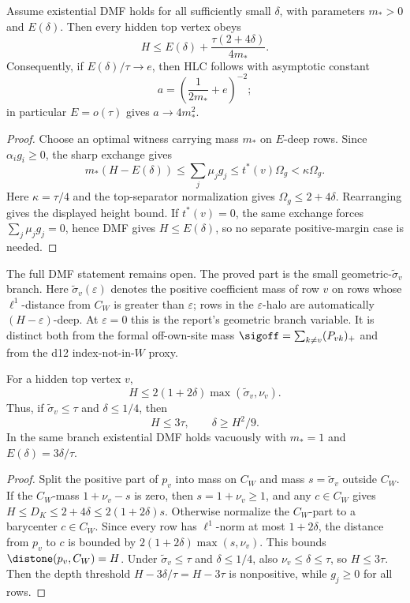 \begin{proposition}
\modauditbadge
Assume existential DMF holds for all sufficiently small \(\delta\), with
parameters \(m_*>0\) and \(E(\delta)\).  Then every hidden top vertex obeys
\[
  H\le E(\delta)+\frac{\tau(2+4\delta)}{4m_*}.
\]
Consequently, if \(E(\delta)/\tau\to e\), then HLC follows with asymptotic
constant
\[
  a=\left(\frac{1}{2m_*}+e\right)^{-2};
\]
in particular \(E=o(\tau)\) gives \(a\to4m_*^2\).
\end{proposition}

\begin{proof}
Choose an optimal witness carrying mass \(m_*\) on \(E\)-deep rows.  Since
\(\alpha_i g_i\ge0\), the sharp exchange gives
\[
  m_*(H-E(\delta))
  \le \sum_j\mu_jg_j
  \le t^*(v)\Omega_g<\kappa\Omega_g .
\]
Here \(\kappa=\tau/4\) and the top-separator normalization gives
\(\Omega_g\le2+4\delta\).  Rearranging gives the displayed height bound.  If
\(t^*(v)=0\), the same exchange forces \(\sum_j\mu_jg_j=0\), hence DMF gives
\(H\le E(\delta)\), so no separate positive-margin case is needed.
\end{proof}

The full DMF statement remains open.  The proved part is the small
geometric-\(\widetilde\sigma_v\) branch.  Here
\(\widetilde\sigma_v(\varepsilon)\) denotes the positive coefficient mass
of row \(v\) on rows whose \(\ell^1\)-distance from \(C_W\) is greater than
\(\varepsilon\); rows in the \(\varepsilon\)-halo are automatically
\((H-\varepsilon)\)-deep.  At \(\varepsilon=0\) this is the report's
geometric branch variable.  It is distinct both from the formal
off-own-site mass \(\sigoff=\sum_{k\ne v}(P_{vk})_+\) and from the d12
index-not-in-\(W\) proxy.

\begin{lemma}
\provedbadge
For a hidden top vertex \(v\),
\[
  H\le 2(1+2\delta)\max(\widetilde\sigma_v,\nu_v).
\]
Thus, if \(\widetilde\sigma_v\le\tau\) and \(\delta\le1/4\), then
\[
  H\le3\tau,\qquad \delta\ge H^2/9.
\]
In the same branch existential DMF holds vacuously with \(m_*=1\) and
\(E(\delta)=3\delta/\tau\).
\end{lemma}

\begin{proof}
Split the positive part of \(p_v\) into mass on \(C_W\) and mass
\(s=\widetilde\sigma_v\) outside \(C_W\).  If the \(C_W\)-mass
\(1+\nu_v-s\) is zero, then \(s=1+\nu_v\ge1\), and any \(c\in C_W\) gives
\(H\le D_K\le2+4\delta\le2(1+2\delta)s\).  Otherwise normalize the
\(C_W\)-part to a barycenter \(c\in C_W\).  Since every row has
\(\ell^1\)-norm at most \(1+2\delta\), the distance from \(p_v\) to \(c\)
is bounded by \(2(1+2\delta)\max(s,\nu_v)\).  This bounds
\(\distone(p_v,C_W)=H\).  Under \(\widetilde\sigma_v\le\tau\) and
\(\delta\le1/4\), also \(\nu_v\le\delta\le\tau\), so \(H\le3\tau\).  Then
the depth threshold \(H-3\delta/\tau=H-3\tau\) is nonpositive, while
\(g_j\ge0\) for all rows.
\end{proof}

